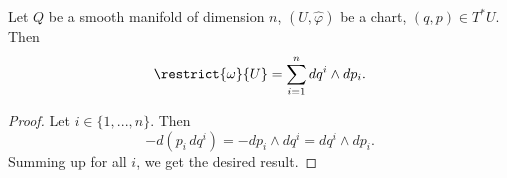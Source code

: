 \begin{corollary}
  Let
    $Q$ be a smooth manifold of dimension $n$,
    $(U, \hat{\varphi})$ be a chart,
    $(q, p) \in T^* U$.
  Then
  \begin{equation}
    \restrict{\omega}{U} = \sum_{i = 1}^n d q^i \wedge d p_i.
  \end{equation}
\end{corollary}
\begin{proof}
  Let $i \in \{1, ..., n\}$.
  Then
  \begin{equation}
    - d(p_i\, d q^i) = - d p_i \wedge d q^i = d q^i \wedge d p_i.
  \end{equation}
  Summing up for all $i$, we get the desired result.
\end{proof}
